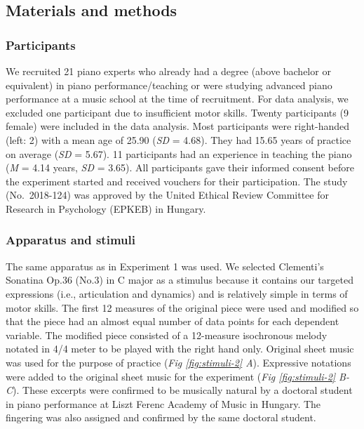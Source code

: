 \documentclass[
  man,floatsintext]{apa6}
\begin{document}
\hypertarget{materials-and-methods-1}{%
\subsection{Materials and methods}\label{materials-and-methods-1}}

\hypertarget{participants-1}{%
\subsubsection{Participants}\label{participants-1}}

We recruited 21 piano experts who already had a degree (above bachelor or equivalent) in piano performance/teaching or were studying advanced piano performance at a music school at the time of recruitment. For data analysis, we excluded one participant due to insufficient motor skills. Twenty participants (9 female) were included in the data analysis. Most participants were right-handed (left: 2) with a mean age of 25.90 (\emph{SD} = 4.68). They had 15.65 years of practice on average (\emph{SD} = 5.67). 11 participants had an experience in teaching the piano (\emph{M} = 4.14 years, \emph{SD} = 3.65). All participants gave their informed consent before the experiment started and received vouchers for their participation. The study (No.~2018-124) was approved by the United Ethical Review Committee for Research in Psychology (EPKEB) in Hungary.

\hypertarget{apparatus-and-stimuli-1}{%
\subsubsection{Apparatus and stimuli}\label{apparatus-and-stimuli-1}}

The same apparatus as in Experiment 1 was used. We selected Clementi's Sonatina Op.36 (No.3) in C major as a stimulus because it contains our targeted expressions (i.e., articulation and dynamics) and is relatively simple in terms of motor skills. The first 12 measures of the original piece were used and modified so that the piece had an almost equal number of data points for each dependent variable. The modified piece consisted of a 12-measure isochronous melody notated in 4/4 meter to be played with the right hand only. Original sheet music was used for the purpose of practice (\emph{Fig \ref{fig:stimuli-2} A}). Expressive notations were added to the original sheet music for the experiment (\emph{Fig \ref{fig:stimuli-2} B-C}). These excerpts were confirmed to be musically natural by a doctoral student in piano performance at Liszt Ferenc Academy of Music in Hungary. The fingering was also assigned and confirmed by the same doctoral student.
\end{document}
